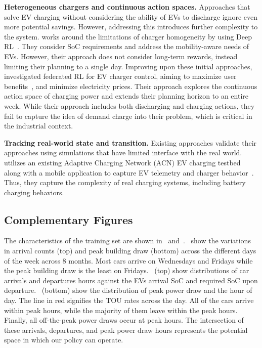 \noindent\textbf{Heterogeneous chargers and continuous action spaces.} Approaches that solve EV charging without considering the ability of EVs to discharge ignore even more potential savings. However, addressing this introduces further complexity to the system.
\citeauthor{NNM2024} works around the limitations of charger homogeneity by using Deep RL~\cite{NNM2024}. They consider SoC requirements and address the mobility-aware needs of EVs. However, their approach does not consider long-term rewards, instead limiting their planning to a single day. 
Improving upon these initial approaches, \citeauthor{ZJS2022} investigated federated RL for EV charger control, aiming to maximize user benefits~\cite{ZJS2022}, and minimize electricity prices. Their approach explores the continuous action space of charging power and extends their planning horizon to an entire week. While their approach includes both discharging and charging actions, they fail to capture the idea of demand charge into their problem, which is critical in the industrial context. 

\noindent\textbf{Tracking real-world state and transition.}
Existing approaches validate their approaches using simulations that have limited interface with the real world. \citeauthor{9409126} utilizes an existing Adaptive Charging Network (ACN) EV charging testbed along with a mobile application to capture EV telemetry and charger behavior~\cite{9409126}. Thus, they capture the complexity of real charging systems, including battery charging behaviors.







\subsection{Complementary Figures}
\label{ss:appendix_figures}
The characteristics of the training set are shown in~ and~.~ show the variations in arrival counts (top) and peak building draw (bottom) across the different days of the week across 8 months. Most cars arrive on Wednesdays and Fridays while the peak building draw is the least on Fridays.~ (top) show distributions of car arrivals and departures hours against the EVs arrival SoC and required SoC upon departure.~ (bottom) show the distribution of peak power draw and the hour of day. The line in red signifies the TOU rates across the day. All of the cars arrive within peak hours, while the majority of them leave within the peak hours. Finally, all off-the-peak power draws occur at peak hours. The intersection of these arrivals, departures, and peak power draw hours represents the potential space in which our policy can operate.

